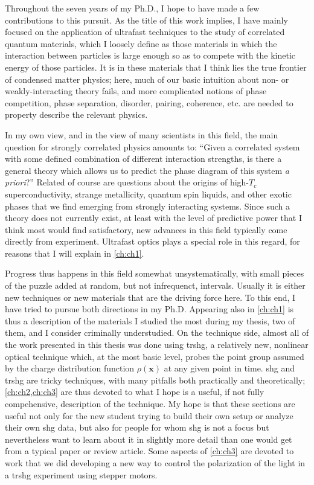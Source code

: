 Throughout the seven years of my Ph.D., I hope to have made a few contributions to this pursuit.
As the title of this work implies, I have mainly focused on the application of ultrafast techniques to the study of correlated quantum materials, which I loosely define as those materials in which the interaction between particles is large enough so as to compete with the kinetic energy of those particles.
It is in these materials that I think lies the true frontier of condensed matter physics; here, much of our basic intuition about non- or weakly-interacting theory fails, and more complicated notions of phase competition, phase separation, disorder, pairing, coherence, etc. are needed to property describe the relevant physics.

In my own view, and in the view of many scientists in this field\cite{alexandradinata_future_2022}, the main question for strongly correlated physics amounts to: ``Given a correlated system with some defined combination of different interaction strengths, is there a general theory which allows us to predict the phase diagram of this system \textit{a priori}?''
Related of course are questions about the origins of high-$T_c$ superconductivity, strange metallicity, quantum spin liquids, and other exotic phases that we find emerging from strongly interacting systems.
Since such a theory does not currently exist, at least with the level of predictive power that I think most would find satisfactory, new advances in this field typically come directly from experiment.
Ultrafast optics plays a special role in this regard, for reasons that I will explain in \cref{ch:ch1}.

Progress thus happens in this field somewhat unsystematically, with small pieces of the puzzle added at random, but not infrequenct, intervals.
Usually it is either new techniques or new materials that are the driving force here.
To this end, I have tried to pursue both directions in my Ph.D.
Appearing also in \cref{ch:ch1} is thus a description of the materials I studied the most during my thesis, two of them,  and  I consider criminally understudied.
On the technique side, almost all of the work presented in this thesis was done using \gls{trshg}, a relatively new, nonlinear optical technique which, at the most basic level, probes the point group assumed by the charge distribution function $\rho(\bm{x})$ at any given point in time.
\Gls{shg} and \gls{trshg} are tricky techniques, with many pitfalls both practically and theoretically; \cref{ch:ch2,ch:ch3} are thus devoted to what I hope is a useful, if not fully compehensive, description of the technique.
My hope is that these sections are useful not only for the new student trying to build their own setup or analyze their own \gls{shg} data, but also for people for whom \gls{shg} is not a focus but nevertheless want to learn about it in slightly more detail than one would get from a typical paper or review article.
Some aspects of \cref{ch:ch3} are devoted to work that we did developing a new way to control the polarization of the light in a \gls{trshg} experiment using stepper motors.

